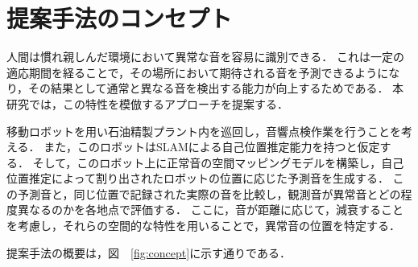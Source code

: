 \documentclass[../main]{subfiles}
\begin{document}
\section{提案手法のコンセプト}
人間は慣れ親しんだ環境において異常な音を容易に識別できる．
これは一定の適応期間を経ることで，その場所において期待される音を予測できるようになり，その結果として通常と異なる音を検出する能力が向上するためである．
本研究では，この特性を模倣するアプローチを提案する．

移動ロボットを用い石油精製プラント内を巡回し，音響点検作業を行うことを考える．
また，このロボットはSLAMによる自己位置推定能力を持つと仮定する．
そして，このロボット上に正常音の空間マッピングモデルを構築し，自己位置推定によって割り出されたロボットの位置に応じた予測音を生成する．
この予測音と，同じ位置で記録された実際の音を比較し，観測音が異常音とどの程度異なるのかを各地点で評価する．
ここに，音が距離に応じて，減衰することを考慮し，それらの空間的な特性を用いることで，異常音の位置を特定する．

提案手法の概要は，図　\ref{fig:concept}に示す通りである．

\label{sec:pmethod_concept}
\end{document}
